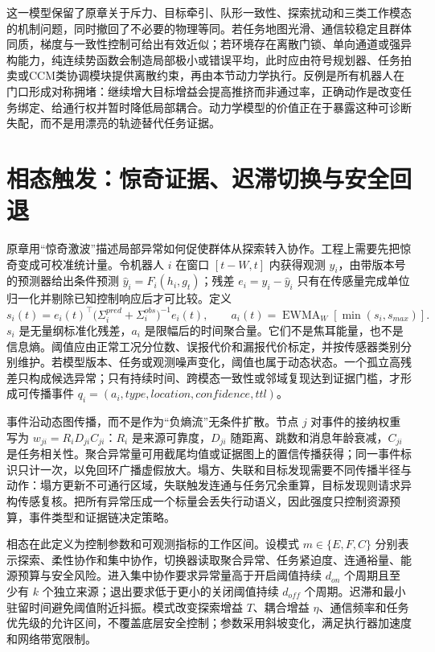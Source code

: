 这一模型保留了原章关于斥力、目标牵引、队形一致性、探索扰动和三类工作模态的机制问题，同时撤回了不必要的物理等同。若任务地图光滑、通信较稳定且群体同质，梯度与一致性控制可给出有效近似；若环境存在离散门锁、单向通道或强异构能力，纯连续势函数会制造局部极小或错误平均，此时应由符号规划器、任务拍卖或CCM类协调模块提供离散约束，再由本节动力学执行。反例是所有机器人在门口形成对称拥堵：继续增大目标增益会提高推挤而非通过率，正确动作是改变任务绑定、给通行权并暂时降低局部耦合。动力学模型的价值正在于暴露这种可诊断失配，而不是用漂亮的轨迹替代任务证据。

\section{相态触发：惊奇证据、迟滞切换与安全回退}
\label{sec:phase_transition_trigger}

原章用“惊奇激波”描述局部异常如何促使群体从探索转入协作。工程上需要先把惊奇变成可校准统计量。令机器人 $i$ 在窗口 $[t-W,t]$ 内获得观测 $y_i$，由带版本号的预测器给出条件预测 $\hat y_i=F_i(h_i,g_t)$；残差 $e_i=y_i-\hat y_i$ 只有在传感量完成单位归一化并剔除已知控制响应后才可比较。定义
\[
 s_i(t)=e_i(t)^\top\bigl(\Sigma_i^{pred}+\Sigma_i^{obs}\bigr)^{-1}e_i(t),
 \qquad a_i(t)=\operatorname{EWMA}_W[\min(s_i,s_{max})].
\]
$s_i$ 是无量纲标准化残差，$a_i$ 是限幅后的时间聚合量。它们不是焦耳能量，也不是信息熵。阈值应由正常工况分位数、误报代价和漏报代价标定，并按传感器类别分别维护。若模型版本、任务或观测噪声变化，阈值也属于动态状态。一个孤立高残差只构成候选异常；只有持续时间、跨模态一致性或邻域复现达到证据门槛，才形成可传播事件 $q_i=(a_i,type,location,confidence,ttl)$。

事件沿动态图传播，而不是作为“负熵流”无条件扩散。节点 $j$ 对事件的接纳权重写为 $w_{ji}=R_iD_{ji}C_{ji}$：$R_i$ 是来源可靠度，$D_{ji}$ 随距离、跳数和消息年龄衰减，$C_{ji}$ 是任务相关性。聚合异常量可用截尾均值或证据图上的置信传播获得；同一事件标识只计一次，以免回环广播虚假放大。塌方、失联和目标发现需要不同传播半径与动作：塌方更新不可通行区域，失联触发连通与任务冗余重算，目标发现则请求异构传感复核。把所有异常压成一个标量会丢失行动语义，因此强度只控制资源预算，事件类型和证据链决定策略。

相态在此定义为控制参数和可观测指标的工作区间。设模式 $m\in\{E,F,C\}$ 分别表示探索、柔性协作和集中协作，切换器读取聚合异常、任务紧迫度、连通裕量、能源预算与安全风险。进入集中协作要求异常量高于开启阈值持续 $d_{on}$ 个周期且至少有 $k$ 个独立来源；退出要求低于更小的关闭阈值持续 $d_{off}$ 个周期。迟滞和最小驻留时间避免阈值附近抖振。模式改变探索增益 $T$、耦合增益 $\eta$、通信频率和任务优先级的允许区间，不覆盖底层安全控制；参数采用斜坡变化，满足执行器加速度和网络带宽限制。

